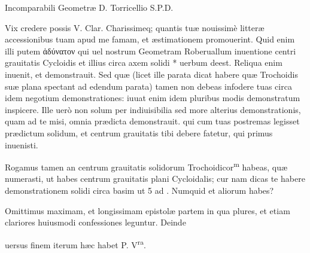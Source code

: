 \documentclass[11pt,a4paper]{article}
\begin{document}
Incomparabili Geometræ D. Torricellio S.P.D.

Vix credere possis V. Clar. Charissimeq; quantis tuæ nouissimè litteræ accessionibus tuam apud me famam, et æstimationem promouerint. Quid enim illi putem ἀδύνατον qui uel nostrum Geometram Roberuallum inuentione centri grauitatis Cycloidis et illius circa axem solidi * uerbum deest. Reliqua enim inuenit, et demonstrauit. Sed quæ (licet ille parata dicat habere quæ Trochoidis suæ plana spectant ad edendum parata) tamen non debeas infodere tuas circa idem negotium demonstrationes: iuuat enim idem pluribus modis demonstratum inspicere. Ille uerò non solum per indiuisibilia sed more alterius demonstrationis, quam ad te misi, omnia prædicta demonstrauit. qui cum tuas postremas legisset prædictum solidum, et centrum grauitatis tibi debere fatetur, qui primus inuenisti.

Rogamus tamen an centrum grauitatis solidorum Trochoidicor\textsuperscript{m} habeas, quæ numerasti, ut habes centrum grauitatis plani Cycloidalis;  cur nam dicas te habere demonstrationem solidi circa basim ut 5 ad . Numquid et aliorum habes?

Omittimus maximam, et longissimam epistolæ partem in qua plures, et etiam clariores huiusmodi confessiones leguntur. Deinde


uersus finem iterum hæc habet P. V\textsuperscript{ra}.
\end{document}
